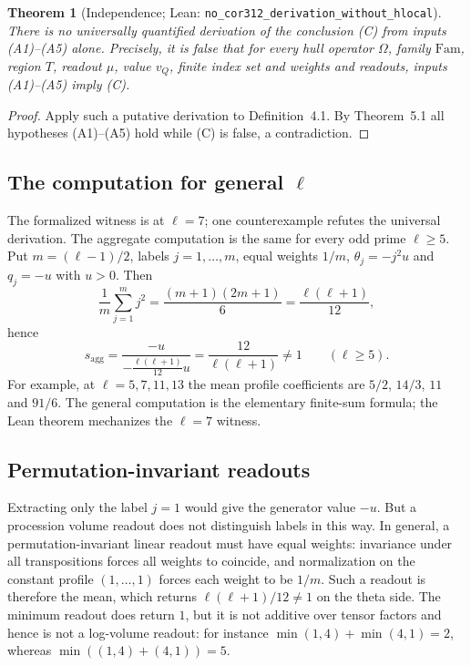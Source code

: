 \documentclass[11pt]{article}
\newcommand{\Fam}{\mathrm{Fam}}
\newtheorem{theorem}{Theorem}[section]
\theoremstyle{definition}
\begin{document}
\begin{theorem}[Independence;
Lean: \texttt{no\_cor312\_derivation\_without\_hlocal}]
There is no universally quantified derivation of the conclusion
(C) from inputs (A1)--(A5) alone.  Precisely, it is false that
for every hull operator $\Omega$, family $\Fam$, region $T$,
readout $\mu$, value $v_Q$, finite index set and weights and
readouts, inputs (A1)--(A5) imply (C).
\end{theorem}

\begin{proof}
Apply such a putative derivation to Definition~4.1.  By
Theorem~5.1 all hypotheses (A1)--(A5) hold while (C) is false,
a contradiction.
\end{proof}

\subsection{The computation for general $\ell$}

The formalized witness is at $\ell=7$; one counterexample refutes
the universal derivation.  The aggregate computation is the same
for every odd prime $\ell\ge5$.  Put $m=(\ell-1)/2$, labels
$j=1,\ldots,m$, equal weights $1/m$, $\theta_j=-j^2u$ and
$q_j=-u$ with $u>0$.  Then
\[
\frac1m\sum_{j=1}^{m}j^2
 =\frac{(m+1)(2m+1)}6
 =\frac{\ell(\ell+1)}{12},
\]
hence
\[
s_{\mathrm{agg}}
 =\frac{-u}{-\frac{\ell(\ell+1)}{12}u}
 =\frac{12}{\ell(\ell+1)}\neq1
\qquad(\ell\ge5).
\]
For example, at $\ell=5,7,11,13$ the mean profile coefficients
are $5/2$, $14/3$, $11$ and $91/6$.  The general computation is
the elementary finite-sum formula; the Lean theorem mechanizes
the $\ell=7$ witness.

\subsection{Permutation-invariant readouts}

Extracting only the label $j=1$ would give the generator value
$-u$.  But a procession volume readout does not distinguish
labels in this way.  In general, a permutation-invariant linear
readout must have equal weights: invariance under all
transpositions forces all weights to coincide, and normalization
on the constant profile $(1,\ldots,1)$ forces each weight to be
$1/m$.  Such a readout is therefore the mean, which returns
$\ell(\ell+1)/12\neq1$ on the theta side.  The minimum readout
does return $1$, but it is not additive over tensor factors and
hence is not a log-volume readout: for instance
$\min(1,4)+\min(4,1)=2$, whereas
$\min((1,4)+(4,1))=5$.
\end{document}
